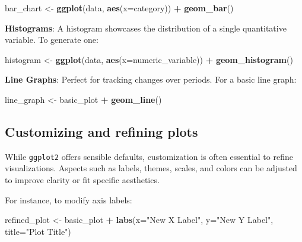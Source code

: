 \documentclass[
  b5paper]{book}
\newenvironment{Shaded}{\begin{snugshade}}{\end{snugshade}}
\newcommand{\AttributeTok}[1]{\textcolor[rgb]{0.13,0.29,0.53}{#1}}
\newcommand{\FunctionTok}[1]{\textcolor[rgb]{0.13,0.29,0.53}{\textbf{#1}}}
\newcommand{\NormalTok}[1]{#1}
\newcommand{\OtherTok}[1]{\textcolor[rgb]{0.56,0.35,0.01}{#1}}
\newcommand{\SpecialCharTok}[1]{\textcolor[rgb]{0.81,0.36,0.00}{\textbf{#1}}}
\newcommand{\StringTok}[1]{\textcolor[rgb]{0.31,0.60,0.02}{#1}}
\begin{document}
\begin{Shaded}
\begin{Highlighting}[]
\NormalTok{bar\_chart }\OtherTok{\textless{}{-}} \FunctionTok{ggplot}\NormalTok{(data, }\FunctionTok{aes}\NormalTok{(}\AttributeTok{x=}\NormalTok{category)) }\SpecialCharTok{+} \FunctionTok{geom\_bar}\NormalTok{()}
\end{Highlighting}
\end{Shaded}

\textbf{Histograms}: A histogram showcases the distribution of a single quantitative variable. To generate one:

\begin{Shaded}
\begin{Highlighting}[]
\NormalTok{histogram }\OtherTok{\textless{}{-}} \FunctionTok{ggplot}\NormalTok{(data, }\FunctionTok{aes}\NormalTok{(}\AttributeTok{x=}\NormalTok{numeric\_variable)) }\SpecialCharTok{+} \FunctionTok{geom\_histogram}\NormalTok{()}
\end{Highlighting}
\end{Shaded}

\textbf{Line Graphs}: Perfect for tracking changes over periods. For a basic line graph:

\begin{Shaded}
\begin{Highlighting}[]
\NormalTok{line\_graph }\OtherTok{\textless{}{-}}\NormalTok{ basic\_plot }\SpecialCharTok{+} \FunctionTok{geom\_line}\NormalTok{()}
\end{Highlighting}
\end{Shaded}

\hypertarget{customizing-and-refining-plots}{%
\subsection*{Customizing and refining plots}\label{customizing-and-refining-plots}}

While \texttt{ggplot2} offers sensible defaults, customization is often essential to refine visualizations. Aspects such as labels, themes, scales, and colors can be adjusted to improve clarity or fit specific aesthetics.

For instance, to modify axis labels:

\begin{Shaded}
\begin{Highlighting}[]
\NormalTok{refined\_plot }\OtherTok{\textless{}{-}}\NormalTok{ basic\_plot }\SpecialCharTok{+} \FunctionTok{labs}\NormalTok{(}\AttributeTok{x=}\StringTok{"New X Label"}\NormalTok{, }\AttributeTok{y=}\StringTok{"New Y Label"}\NormalTok{, }\AttributeTok{title=}\StringTok{"Plot Title"}\NormalTok{)}
\end{Highlighting}
\end{Shaded}
\end{document}
